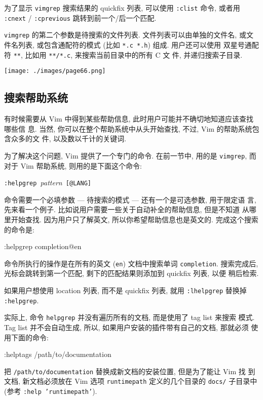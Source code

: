\begin{warning}
    为了显示 \texttt{vimgrep} 搜索结果的 quickfix 列表, 可以使用 \texttt{:clist}
    命令, 或者用 \texttt{:cnext} / \texttt{:cprevious} 跳转到前一个/后一个匹配.
\end{warning}

\texttt{vimgrep} 的第二个参数是待搜索的文件列表. 文件列表可以由单独的文件名,
或文件名列表, 或包含通配符的模式 (比如 \texttt{*.c *.h}) 组成. 用户还可以使用
双星号通配符 \texttt{**}, 比如用 \texttt{**/*.c}, 来搜索当前目录中的所有 C 文
件, 并递归搜索子目录.
\begin{center}
    \texttt{[image: ./images/page66.png]}
\end{center}
\subsection{搜索帮助系统}
\label{subsec:search_the_help_system}

有时候需要从 Vim 中得到某些帮助信息, 此时用户可能并不确切地知道应该查找哪些信
息. 当然, 你可以在整个帮助系统中从头开始查找, 不过, Vim 的帮助系统包含众多的文
件, 以及数以千计的关键词.

为了解决这个问题, Vim 提供了一个专门的命令. 在前一节中, 用的是
\texttt{vimgrep}, 而对于 Vim 帮助系统, 则用的是下面这个命令:
\begin{vimcmdform}
\texttt{:helpgrep }\textit{pattern}\texttt{ [@LANG]}
\end{vimcmdform}
命令需要一个必填参数 --- 待搜索的模式 --- 还有一个是可选参数, 用于限定语
言, 先来看一个例子. 比如说用户需要一些关于自动补全的帮助信息, 但是不知道
从哪里开始查找. 因为用户只了解英文, 所以你希望帮助信息也是英文的. 完成这个搜索
的命令是:
\begin{vimcode}
:helpgrep completion@en
\end{vimcode}
命令所执行的操作是在所有的英文 (\texttt{en}) 文档中搜索单词 \texttt{completion}.
搜索完成后, 光标会跳转到第一个匹配, 剩下的匹配结果则添加到 quickfix 列表, 以便
稍后检索.

\begin{warning}
    如果用户想使用 location 列表, 而不是 quickfix 列表, 就用 \texttt{:lhelpgrep}
    替换掉 \texttt{:helpgrep}.
\end{warning}

实际上, 命令 \texttt{helpgrep} 并没有遍历所有的文档, 而是使用了 tag list 来搜索
模式. Tag list 并不会自动生成, 所以, 如果用户安装的插件带有自己的文档, 那就必须
使用下面的命令:
\begin{vimcode}
    :helptags /path/to/documentation
\end{vimcode}
把 \texttt{/path/to/documentation} 替换成新文档的安装位置, 但是为了能让 Vim 找
到文档, 新文档必须放在 Vim 选项 \texttt{runtimepath} 定义的几个目录的
\texttt{docs/} 子目录中 (参考 \texttt{:help 'runtimepath'}).

